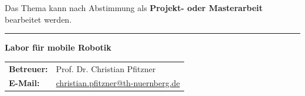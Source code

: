 \documentclass{ohm_project_description}
\begin{document}
\vspace{0.5cm}
Das Thema kann nach Abstimmung als \textbf{Projekt- oder Masterarbeit} bearbeitet werden.

\vfill
\textcolor{ohm_red}{\rule{\linewidth}{0.4mm}}
\textbf{\textcolor{ohm_red}{Labor für mobile Robotik}} \\
\begin{tabular}{@{}ll}
\textbf{Betreuer:} & Prof. Dr. Christian Pfitzner \\
\textbf{E-Mail:}   & \href{mailto:christian.pfitzner@th-nuernberg.de}{christian.pfitzner@th-nuernberg.de} \\
\end{tabular}
\end{document}

